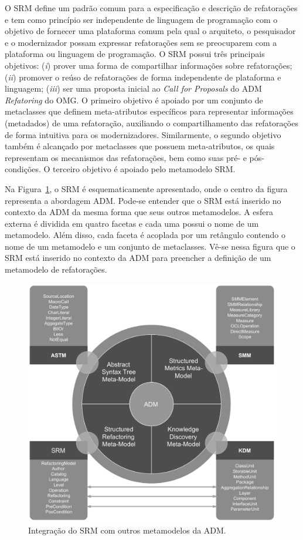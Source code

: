 O SRM define um padrão comum para a especificação e descrição de refatorações e tem como princípio ser independente de linguagem de programação com o objetivo de fornecer uma plataforma comum pela qual o arquiteto, o pesquisador e o modernizador possam expressar refatorações sem se preocuparem com a plataforma ou linguagem de programação. O SRM possui três principais objetivos: (\textit{i}) prover uma forma de compartilhar informações sobre refatorações; (\textit{ii}) promover o reúso de refatorações de forma independente de plataforma e linguagem; (\textit{iii}) ser uma proposta inicial ao \textit{Call for Proposals} do ADM \textit{Refatoring} do OMG. O primeiro objetivo é apoiado por um conjunto de metaclasses que definem meta-atributos específicos para representar informações (metadados) de uma refatoração, auxiliando o compartilhamento das refatorações de forma intuitiva para os modernizadores. Similarmente, o segundo objetivo também é alcançado por metaclasses que possuem meta-atributos, os quais representam os mecanismos das refatorações, bem como suas pré- e pós-condições. O terceiro objetivo é apoiado pelo metamodelo SRM.
 
Na Figura~\ref{fig:refactoring_metamodel}, o SRM é esquematicamente apresentado, onde o centro da figura representa a abordagem ADM. Pode-se entender que o SRM está inserido no contexto da ADM da mesma forma que seus outros metamodelos. A esfera externa é dividida em quatro facetas e cada uma possui o nome de um metamodelo. Além disso, cada faceta é acoplada por um retângulo contendo o nome de um metamodelo e um conjunto de metaclasses. Vê-se nessa figura  que o SRM está inserido no contexto da ADM para preencher a definição de um metamodelo de refatorações. 

\begin{figure}[h]
	\centering
	\caption{Integração do SRM com outros metamodelos da ADM.}
	\label{fig:refactoring_metamodel}
	\includegraphics[scale=0.6]{images/SRM2Formatted}
	\fautor
\end{figure}

